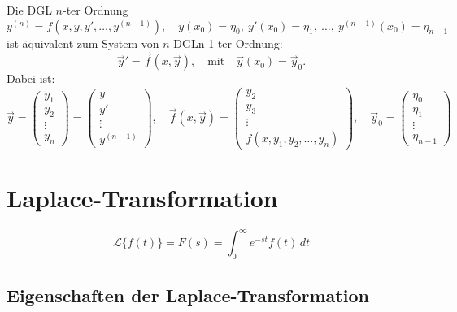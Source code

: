 \documentclass[a4paper,11pt,oneside,open=any,parskip=half, DIV=15]{scrreprt}
\begin{document}
   \begin{importantbox}
      Die DGL \( n \)-ter Ordnung
      \[
         y^{(n)} = f(x, y, y', \ldots, y^{(n-1)}), \quad y(x_0) = \eta_0,\ y'(x_0) = \eta_1,\ \ldots,\ y^{(n-1)}(x_0) = \eta_{n-1}
      \]
      ist äquivalent zum System von \( n \) DGLn 1-ter Ordnung:
      \[
         \vec{y}' = \vec{f}(x, \vec{y}), \quad \text{mit} \quad \vec{y}(x_0) = \vec{y}_0.
      \]
      Dabei ist:
      \[
         \vec{y} = 
         \begin{pmatrix}
            y_1 \\
            y_2 \\
            \vdots \\
            y_n
         \end{pmatrix}
         =
         \begin{pmatrix}
            y \\
            y' \\
            \vdots \\
            y^{(n-1)}
         \end{pmatrix}, \quad 
         \vec{f}(x, \vec{y}) =
         \begin{pmatrix}
            y_2 \\
            y_3 \\
            \vdots \\
            f(x, y_1, y_2, \ldots, y_n)
         \end{pmatrix}, \quad 
         \vec{y}_0 =
         \begin{pmatrix}
            \eta_0 \\
            \eta_1 \\
            \vdots \\
            \eta_{n-1}
         \end{pmatrix}
      \]
   \end{importantbox}

\section{Laplace-Transformation}

   \begin{importantbox}
      \[
         \mathcal{L}\{f(t)\} = F(s) = \int_{0}^{\infty} e^{-st}f(t)\,dt
      \]
   \end{importantbox}

   \subsection*{Eigenschaften der Laplace-Transformation}
\end{document}
